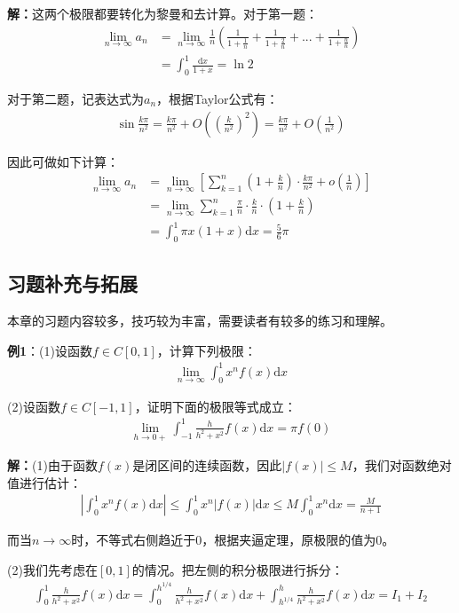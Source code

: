 \documentclass{ctexart}
\let\oldtextbf\textbf %
\renewcommand{\textbf}[1]{\textcolor{btex}{\oldtextbf{#1}}} %
\begin{document}
\textbf{解：}这两个极限都要转化为黎曼和去计算。对于第一题：
\begin{align*}
    \lim_{n\to\infty}a_n&=\lim_{n\to\infty}\frac{1}{n}\left(\frac{1}{1+\frac{1}{n}}+\frac{1}{1+\frac{2}{n}}+...+\frac{1}{1+\frac{n}{n}}\right)\\
    &=\int_0^1\frac{\mathrm{d}x}{1+x}=\ln 2
\end{align*}

对于第二题，记表达式为$a_n$，根据Taylor公式有：
\begin{align*}
    \sin\frac{k\pi}{n^2}=\frac{k\pi}{n^2}+O((\frac{k}{n^2})^2)=\frac{k\pi}{n^2}+O(\frac{1}{n^2})
\end{align*}

因此可做如下计算：
\begin{align*}
\lim_{n\to\infty}a_n&=\lim_{n\to\infty}\left[\sum_{k=1}^n(1+\frac{k}{n})\cdot\frac{k\pi}{n^2}+o(\frac{1}{n})\right]\\
    &=\lim_{n\to\infty}\sum_{k=1}^n\frac{\pi}{n}\cdot\frac{k}{n}\cdot(1+\frac{k}{n})\\
    &=\int_0^1 \pi x(1+x)\mathrm{d}x=\frac{5}{6}\pi
\end{align*}

\subsection{习题补充与拓展}
本章的习题内容较多，技巧较为丰富，需要读者有较多的练习和理解。

\textbf{例1}：(1)设函数$f\in C[0,1]$，计算下列极限：
\begin{align*}
    \lim_{n\to\infty}\int_0^1 x^nf(x)\mathrm{d}x
\end{align*}

(2)设函数$f\in C[-1,1]$，证明下面的极限等式成立：
\begin{align*}
    \lim_{h\to 0+}\int_{-1}^1\frac{h}{h^2+x^2}f(x)\mathrm{d}x=\pi f(0)
\end{align*}

\textbf{解：}(1)由于函数$f(x)$是闭区间的连续函数，因此$|f(x)|\leq M$，我们对函数绝对值进行估计：
\begin{align*}
    \left| \int_0^1 x^n f(x)\mathrm{d}x\right|\leq \int_0^1 x^n|f(x)|\mathrm{d}x\leq M\int_0^1 x^n\mathrm{d}x=\frac{M}{n+1}
\end{align*}

而当$n\to\infty$时，不等式右侧趋近于0，根据夹逼定理，原极限的值为0。

(2)我们先考虑在$[0,1]$的情况。把左侧的积分极限进行拆分：
\begin{align*}
\int_{0}^1\frac{h}{h^2+x^2}f(x)\mathrm{d}x=\int_{0}^{h^{1/4}}\frac{h}{h^2+x^2}f(x)\mathrm{d}x
+\int_{h^{1/4}}^h\frac{h}{h^2+x^2}f(x)\mathrm{d}x=I_1+I_2
\end{align*}
\end{document}
